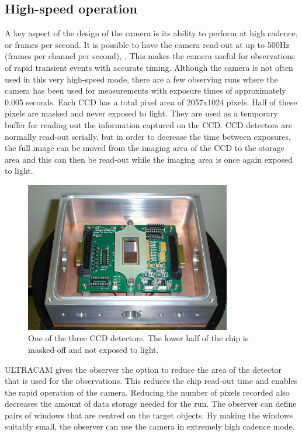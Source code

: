 \subsection{High-speed operation}
A key aspect of the design of the camera is its ability to perform at high cadence, or frames per second. It is possible to have the camera read-out at up to 500Hz (frames per channel per second), \citep{dhillon07}. This makes the camera useful for observations of rapid transient events with accurate timing. Although the camera is not often used in this very high-speed mode, there are a few observing runs where the camera has been used for measurements with exposure times of approximately 0.005 seconds. Each CCD has a total pixel area of 2057x1024 pixels. Half of these pixels are masked and never exposed to light. They are used as a temporary buffer for reading out the information captured on the CCD. CCD detectors are normally read-out serially, but in order to decrease the time between exposures, the full image can be moved from the imaging area of the CCD to the storage area and this can then be read-out while the imaging area is once again exposed to light. 

\begin{figure}
\centering
\includegraphics[width=90mm]{images/ccd.png}
\caption{One of the three CCD detectors. The lower half of the chip is masked-off and not exposed to light.}
\label{fig2}
\end{figure}

ULTRACAM gives the observer the option to reduce the area of the detector that is used for the observations. This reduces the chip read-out time and enables the rapid operation of the camera. Reducing the number of pixels recorded also decreases the amount of data storage needed for the run. The observer can define pairs of windows that are centred on the target objects. By making the windows suitably small, the observer can use the camera in extremely high cadence mode. 

